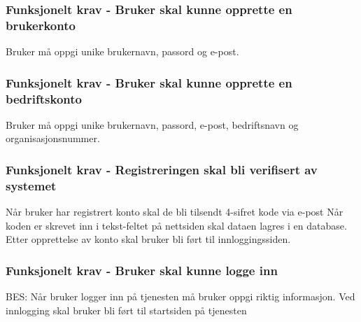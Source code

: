 \documentclass[12pt]{article}
\begin{document}
\subsubsection{Funksjonelt krav - Bruker skal kunne opprette en brukerkonto}
Bruker må oppgi unike brukernavn, passord og e-post.

\subsubsection{Funksjonelt krav - Bruker skal kunne opprette en bedriftskonto}
Bruker må oppgi unike brukernavn, passord, e-post, bedriftsnavn og organisasjonsnummer.

\subsubsection{Funksjonelt krav - Registreringen skal bli verifisert av systemet}
Når bruker har registrert konto skal de bli tilsendt 4-sifret kode via e-post Når koden er skrevet inn i tekst-feltet på nettsiden skal dataen lagres i en database. Etter opprettelse av konto skal bruker bli ført til innloggingssiden.

\subsubsection{Funksjonelt krav - Bruker skal kunne logge inn}
BES: Når bruker logger inn på tjenesten må bruker oppgi riktig informasjon. Ved innlogging skal bruker bli ført til startsiden på tjenesten
\end{document}
